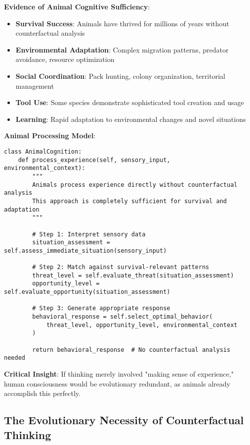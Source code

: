 \documentclass[12pt,a4paper]{article}
\begin{document}
\textbf{Evidence of Animal Cognitive Sufficiency}:
\begin{itemize}
\item \textbf{Survival Success}: Animals have thrived for millions of years without counterfactual analysis
\item \textbf{Environmental Adaptation}: Complex migration patterns, predator avoidance, resource optimization
\item \textbf{Social Coordination}: Pack hunting, colony organization, territorial management
\item \textbf{Tool Use}: Some species demonstrate sophisticated tool creation and usage
\item \textbf{Learning}: Rapid adaptation to environmental changes and novel situations
\end{itemize}

\textbf{Animal Processing Model}:
\begin{lstlisting}[style=pythonstyle, caption=Animal Experience Processing (Sufficient for Survival)]
class AnimalCognition:
    def process_experience(self, sensory_input, environmental_context):
        """
        Animals process experience directly without counterfactual analysis
        This approach is completely sufficient for survival and adaptation
        """
        
        # Step 1: Interpret sensory data
        situation_assessment = self.assess_immediate_situation(sensory_input)
        
        # Step 2: Match against survival-relevant patterns
        threat_level = self.evaluate_threat(situation_assessment)
        opportunity_level = self.evaluate_opportunity(situation_assessment)
        
        # Step 3: Generate appropriate response
        behavioral_response = self.select_optimal_behavior(
            threat_level, opportunity_level, environmental_context
        )
        
        return behavioral_response  # No counterfactual analysis needed
\end{lstlisting}

\textbf{Critical Insight}: If thinking merely involved "making sense of experience," human consciousness would be evolutionary redundant, as animals already accomplish this perfectly.

\subsection{The Evolutionary Necessity of Counterfactual Thinking}
\end{document}
